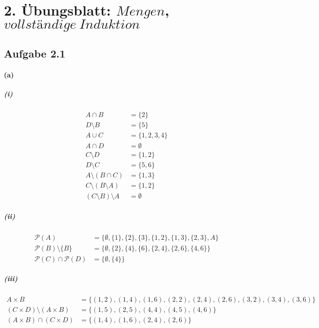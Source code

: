 \section{2. Übungsblatt: $Mengen$, $vollständige\ Induktion$}

\subsection{Aufgabe 2.1}

\paragraph{(a)}

\subparagraph{(i)}
\begin{align*}
A\cap B&=\{2\}\\
D\setminus B&=\{5\}\\
A\cup C&=\{1,2,3,4\}\\
A\cap D&=\emptyset\\
C\setminus D&=\{1,2\}\\
D\setminus C&=\{5,6\}\\
A\setminus(B\cap C)&=\{1,3\}\\
C\setminus (B\setminus A)&=\{1,2\}\\
(C\setminus B)\setminus A&=\emptyset
\end{align*}

\subparagraph{(ii)}
\begin{align*}
\mathcal{P}(A)&=\{\emptyset,\{1\},\{2\},\{3\},\{1,2\},\{1,3\},\{2,3\},A\}\\
\mathcal{P}(B)\setminus\{B\}&=\{\emptyset,\{2\},\{4\},\{6\},\{2,4\},\{2,6\},\{4,6\}\}\\
\mathcal{P}(C)\cap\mathcal{P}(D)&=\{\emptyset,\{4\}\}
\end{align*}

\subparagraph{(iii)}
\begin{align*}
A\times B&=\{(1,2),(1,4),(1,6),(2,2),(2,4),(2,6),(3,2),(3,4),(3,6)\}\\
(C\times D)\setminus(A\times B)&=\{(1,5),(2,5),(4,4),(4,5),(4,6)\}\\
(A\times B)\cap(C\times D)&=\{(1,4),(1,6),(2,4),(2,6)\}
\end{align*}

